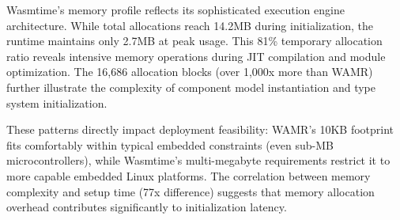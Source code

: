 Wasmtime's memory profile reflects its sophisticated execution engine architecture. While total allocations reach 14.2MB during initialization, the runtime maintains only 2.7MB at peak usage. This 81\% temporary allocation ratio reveals intensive memory operations during JIT compilation and module optimization. The 16,686 allocation blocks (over 1,000x more than WAMR) further illustrate the complexity of component model instantiation and type system initialization.

These patterns directly impact deployment feasibility: WAMR's 10KB footprint fits comfortably within typical embedded constraints (even sub-MB microcontrollers), while Wasmtime's multi-megabyte requirements restrict it to more capable embedded Linux platforms. The correlation between memory complexity and setup time (77x difference) suggests that memory allocation overhead contributes significantly to initialization latency.





